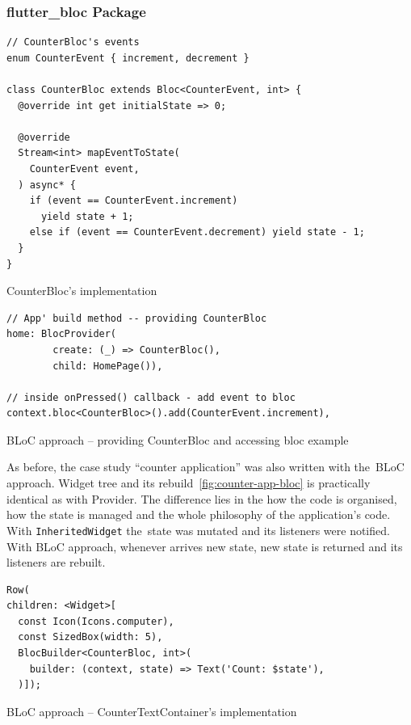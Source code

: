 \subsubsection{flutter\_bloc Package}
\begin{listing}[ht]
\begin{verbatim}
// CounterBloc's events
enum CounterEvent { increment, decrement }

class CounterBloc extends Bloc<CounterEvent, int> {
  @override int get initialState => 0;

  @override
  Stream<int> mapEventToState(
    CounterEvent event,
  ) async* {
    if (event == CounterEvent.increment)
      yield state + 1;
    else if (event == CounterEvent.decrement) yield state - 1;
  }
}
\end{verbatim}
\caption{CounterBloc's implementation}
\label{listing:counter-bloc-bloc}
\end{listing}

\begin{listing}[ht]
\begin{verbatim}
// App' build method -- providing CounterBloc
home: BlocProvider(
        create: (_) => CounterBloc(),
        child: HomePage()),
        
// inside onPressed() callback - add event to bloc
context.bloc<CounterBloc>().add(CounterEvent.increment),
\end{verbatim}
\caption{BLoC approach -- providing CounterBloc and accessing bloc example}
\label{listing:counter-bloc-homepage}
\end{listing}

As before, the case study ``counter application'' was also written with the~BLoC approach. Widget tree and its rebuild~\cref{fig:counter-app-bloc} is practically identical as with Provider. The difference lies in the how the code is organised, how the state is managed and the whole philosophy of the application's code. With \verb|InheritedWidget| the~state was mutated and its listeners were notified. With BLoC approach, whenever arrives new state, new state is returned and its listeners are rebuilt. 

\begin{listing}[ht]
\begin{verbatim}
Row(
children: <Widget>[
  const Icon(Icons.computer),
  const SizedBox(width: 5),
  BlocBuilder<CounterBloc, int>(
    builder: (context, state) => Text('Count: $state'),
  )]);
\end{verbatim}
\caption{BLoC approach -- CounterTextContainer's implementation}
\label{listing:counter-bloc-counter-text}
\end{listing}

